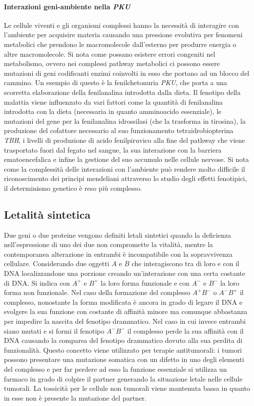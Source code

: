 \paragraph{Interazioni geni-ambiente nella \emph{PKU}}
Le cellule viventi e gli organismi complessi hanno la necessit\`a di interagire con l'ambiente per acquisire materia causando una pressione evolutiva per fenomeni metabolici che
prendono le macromolecole dall'esterno per produrre energia o altre macromolecole. Si nota come possano esistere errori congeniti nel metabolismo, ovvero nei complessi pathway 
metabolici ci possono essere mutazioni di geni codificanti enzimi coinvolti in esso che portano ad un blocco del cammino. Un esempio di questo \`e la fenilchetonuria \emph{PKU}, 
che porta a una scorretta elaborazione della fenilanalina introdotta dalla dieta. Il fenotipo della malattia viene influenzato da vari fattori come la quantit\`a di fenilanalina
introdotta con la dieta (necessaria in quanto amminoacido essenziale), le mutazioni del gene per la fenilanalina idrossilasi (che la trasforma in tirosina), la produzione del cofattore 
necessario al suo funzionamento tetraidrobiopterina \emph{TBH}, i livelli di produzione di acido fenilpiruvico alla fine del pathway che viene trasportato fuori dal fegato nel sangue, 
la sua interazione con la barriera ematoencefalica e infine la gestione del suo accumulo nelle cellule nervose. Si nota come la complessit\`a delle interazioni con l'ambiente pu\`o 
rendere molto difficile il riconoscimento dei principi mendeliani attraverso lo studio degli effetti fenotipici, il determinismo genetico \`e reso pi\`u complesso. 
\subsection{Letalit\`a sintetica}
Due geni o due proteine vengono definiti letali sintetici quando la deficienza nell'espressione di uno dei due non compromette la vitalit\`a, mentre la contemporanea alterazione in 
entrambi \`e incompatibile con la sopravvivenza cellulare. Considerando due oggetti $A$ e $B$ che interagiscono tra di loro e con il DNA localizzandone una porzione creando 
un'interazione con una certa costante di DNA. Si indica con $A^+$ e $B^+$ la loro forma funzionale e con $A^-$ e $B^-$ la loro forma non funzionale. Nel caso della formazione del 
complesso $A^+B^-$ o $A^-B^+$ il complesso, nonostante la forma modificata \`e ancora in grado di legare il DNA e svolgere la sua funzione con costante di affinit\`a minore ma comunque
abbastanza per impedire la nascita del fenotipo drammatico. Nel caso in cui invece entrambi siano mutati e si formi il fenotipo $A^-B^-$ il complesso perde la sua affinit\`a con il 
DNA causando la comparsa del fenotipo drammatico dovuto alla sua perdita di funzionalit\`a. Questo concetto viene utilizzato per terapie antitumorali: i tumori possono presentare una
mutazione somatica con un difetto in uno degli elementi del complesso e per far perdere ad esso la funzione essenziale si utilizza un farmaco in grado di colpire il partner generando
la situazione letale nelle cellule tumorali. La tossicit\`a per le cellule non tumorali viene mantenuta bassa in quanto in esse non \`e presente la mutazione del partner. 
